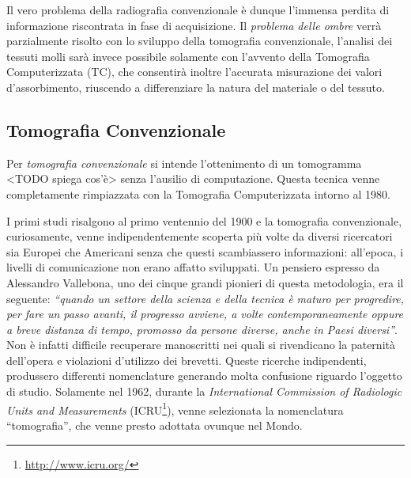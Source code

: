\documentclass[a4paper,11pt, oneside]{article}
\begin{document}
                \par
                    Il vero problema della radiografia convenzionale è dunque l'immensa perdita di informazione riscontrata in fase di acquisizione. Il \textit{problema delle ombre} verrà parzialmente risolto con lo sviluppo della tomografia convenzionale, l'analisi dei tessuti molli sarà invece possibile solamente con l'avvento della Tomografia Computerizzata (TC), che consentirà inoltre l'accurata misurazione dei valori d'assorbimento, riuscendo a differenziare la natura del materiale o del tessuto.
                            
            \subsection{Tomografia Convenzionale}
                \par
                    Per \textit{tomografia convenzionale} si intende l'ottenimento di un tomogramma <TODO spiega cos'è> senza l'ausilio di computazione. Questa tecnica venne completamente rimpiazzata con la Tomografia Computerizzata intorno al 1980.
                            
                \par
                    I primi studi risalgono al primo ventennio del 1900 e la tomografia convenzionale, curiosamente, venne indipendentemente scoperta più volte da diversi ricercatori sia Europei che Americani senza che questi scambiassero informazioni: all'epoca, i livelli di comunicazione non erano affatto sviluppati. Un pensiero espresso da Alessandro Vallebona, uno dei cinque grandi pionieri di questa metodologia, era il seguente: \textit{“quando un settore della scienza e della tecnica è maturo per progredire, per fare un passo avanti, il progresso avviene, a volte contemporaneamente oppure a breve distanza di tempo, promosso da persone diverse, anche in Paesi diversi”}\cite{vallebona-pensiero}.
                    Non è infatti difficile recuperare manoscritti nei quali si rivendicano la paternità dell'opera e violazioni d'utilizzo dei brevetti\cite{vallebona-difesa}. Queste ricerche indipendenti, produssero differenti nomenclature generando molta confusione riguardo l'oggetto di studio. Solamente nel 1962, durante la \textit{International Commission of Radiologic Units and Measurements} (ICRU\footnote{\url{http://www.icru.org/}}), venne selezionata la nomenclatura “tomografia”, che venne presto adottata ovunque nel Mondo.
                            
\end{document}
